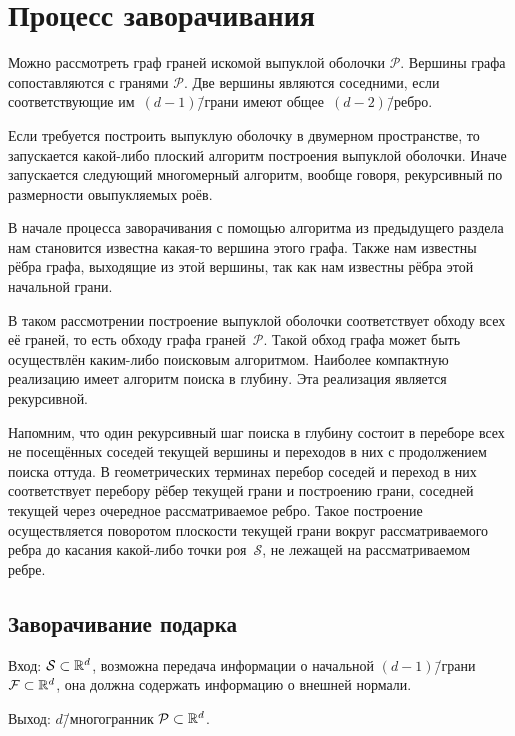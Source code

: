 \documentclass[a4paper,12pt]{article}
\newcommand{\R}[1][]{%
  \ifthenelse{\equal{#1}{}}%
  {\mathbb{R}}%
  {\mathbb{R}^{#1}}}
\newcommand{\Swarm}{\mathcal{S}}              %
\newcommand{\Polytop}{\mathcal{P}}         %
\newcommand{\Facet}{\mathcal{F}}              %
\renewcommand{\.}{\hspace{0.2ex}}
\begin{document}
\section{Процесс заворачивания}
  Можно рассмотреть граф граней искомой выпуклой оболочки $\Polytop$. Вершины графа сопоставляются с гранями $\Polytop$. Две вершины являются соседними, если соответствующие им~$(d-1)$\=/грани имеют общее~$(d-2)$\=/ребро.

  Если требуется построить выпуклую оболочку в двумерном пространстве, то запускается какой-либо плоский алгоритм построения выпуклой оболочки. Иначе запускается следующий многомерный алгоритм, вообще говоря, рекурсивный по размерности овыпукляемых роёв.

  В начале процесса заворачивания с помощью алгоритма из предыдущего раздела нам становится известна какая-то вершина этого графа. Также нам известны рёбра графа, выходящие из этой вершины, так как нам известны рёбра этой начальной грани.

  В таком рассмотрении построение выпуклой оболочки соответствует обходу всех её граней, то есть обходу графа граней~$\Polytop$. Такой обход графа может быть осуществлён каким-либо поисковым алгоритмом. Наиболее компактную реализацию имеет алгоритм поиска в глубину. Эта реализация является рекурсивной.

  Напомним, что один рекурсивный шаг поиска в глубину состоит в переборе всех не посещённых соседей текущей вершины и переходов в них с продолжением поиска оттуда. В геометрических терминах перебор соседей и переход в них соответствует перебору рёбер текущей грани и построению грани, соседней текущей через очередное рассматриваемое ребро. Такое построение осуществляется поворотом плоскости текущей грани вокруг рассматриваемого ребра до касания какой-либо точки роя~$\Swarm$, не лежащей на рассматриваемом ребре.

  \subsection{Заворачивание подарка}
  \label{sec:GW}

    Вход: $\Swarm \subset \R[d]$, возможна передача информации о начальной $(d-1)$\=/грани $\Facet \subset \R[d]$, она должна содержать информацию о внешней нормали.

    Выход: $d$\=/многогранник $\Polytop \subset \R[d]$.
\end{document}

